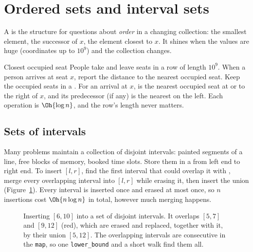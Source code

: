 \section[Ordered sets and interval sets]{Ordered sets and interval sets \hfill \silver}\label{sec:ordered-sets}

A  is the structure for questions about \emph{order} in a changing collection: the smallest element, the successor
of $x$, the element closest to $x$. It shines when the values are huge (coordinates up to $10^9$) and the collection
changes.

\begin{problem}{Closest occupied seat}
People take and leave seats in a row of length $10^9$. When a person arrives at seat $x$, report the distance to the nearest
occupied seat.
\solution Keep the occupied seats in a . For an arrival at $x$,  is the nearest occupied seat
at or to the right of $x$, and its predecessor (if any) is the nearest on the left. Each operation is $\Oh{\log n}$, and the
row's length never matters.
\end{problem}

\subsection{Sets of intervals}

Many problems maintain a collection of disjoint intervals: painted segments of a line, free blocks of memory, booked time
slots. Store them in a  from left end to right end. To insert $[l, r]$, find the first interval that could overlap it
with , merge every overlapping interval into $[l, r]$ while erasing it, then insert the union
(Figure~\ref{fig:intervalset}). Every interval is inserted once and erased at most once, so $n$ insertions cost
$\Oh{n \log n}$ in total, however much merging happens.

\begin{figure}[htbp]
\centering
{}
\caption{Inserting $[6, 10]$ into a set of disjoint intervals. It overlaps $[5, 7]$ and $[9, 12]$ (red), which are erased and
replaced, together with it, by their union $[5, 12]$. The overlapping intervals are consecutive in the \texttt{map}, so one
\texttt{lower\_bound} and a short walk find them all.}
\label{fig:intervalset}
\end{figure}


